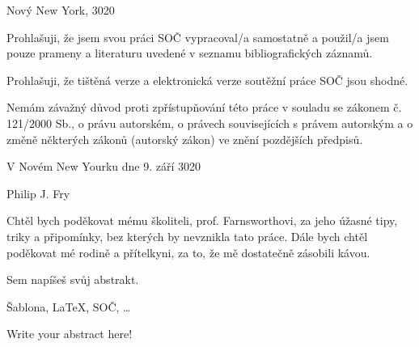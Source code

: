 \documentclass[12pt, a4paper,
 twoside,        %
 openright
]{report}
\begin{document}
\noindent Nový New York, 3020

\cleardoublepage


\noindent Prohlašuji, že jsem svou práci SOČ vypracoval/a samostatně a použil/a jsem pouze prameny a literaturu uvedené v seznamu bibliografických záznamů.

\noindent Prohlašuji, že tištěná verze a elektronická verze soutěžní práce SOČ jsou shodné. 

\noindent Nemám závažný důvod proti zpřístupňování této práce v souladu se zákonem č. 121/2000 Sb., o právu autorském, o právech souvisejících s právem autorským a o změně některých zákonů (autorský zákon) ve znění pozdějších předpisů. 

\vspace{24 pt}

\noindent V Novém New Yourku dne 9. září 3020 \dotfill{} 

\hspace{8cm} Philip J. Fry

\cleardoublepage

\vspace*{0.8\textheight}

\noindent
Chtěl bych poděkovat mému školiteli, prof. Farnsworthovi, za jeho úžasné tipy, triky a připomínky, bez kterých by nevznikla tato práce. Dále bych chtěl poděkovat mé rodině a přítelkyni, za to, že mě dostatečně zásobili kávou.

\cleardoublepage


\noindent Sem napíšeš svůj abstrakt. \lipsum[1]

\vspace{18pt}


\noindent Šablona, \LaTeX, SOČ, \dots 

\vspace{18pt}


\noindent Write your abstract here! \lipsum[1]

\vspace{18pt}

\end{document}
